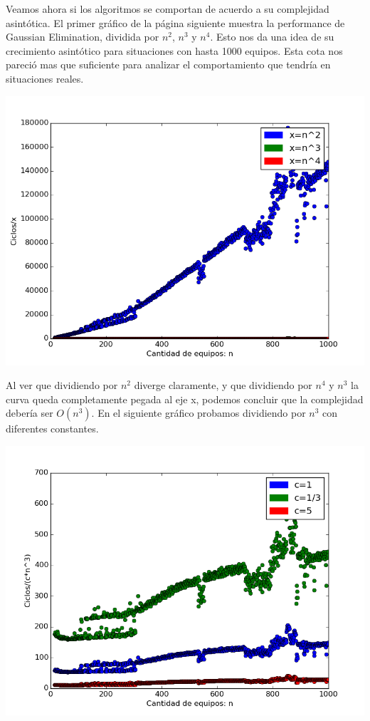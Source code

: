  Veamos ahora si los algoritmos se comportan de acuerdo a su complejidad asintótica. El primer gráfico de la página siguiente muestra la performance de Gaussian Elimination, dividida por $n^2$, $n^3$ y $n^4$. Esto nos da una idea de su crecimiento asintótico para situaciones con hasta 1000 equipos. Esta cota nos pareció mas que suficiente para analizar el comportamiento que tendría en situaciones reales.
 
 \includegraphics[scale=0.7]{img/complejidadgaussian.png}
 
 Al ver que dividiendo por $n^2$ diverge claramente, y que dividiendo por $n^4$ y $n^3$ la curva queda completamente pegada al eje x, podemos concluir que la complejidad debería ser $O(n^3)$. En el siguiente gráfico probamos dividiendo por $n^3$ con diferentes constantes.
 
  \includegraphics[scale=0.7]{img/constantegaussian.png}
 
